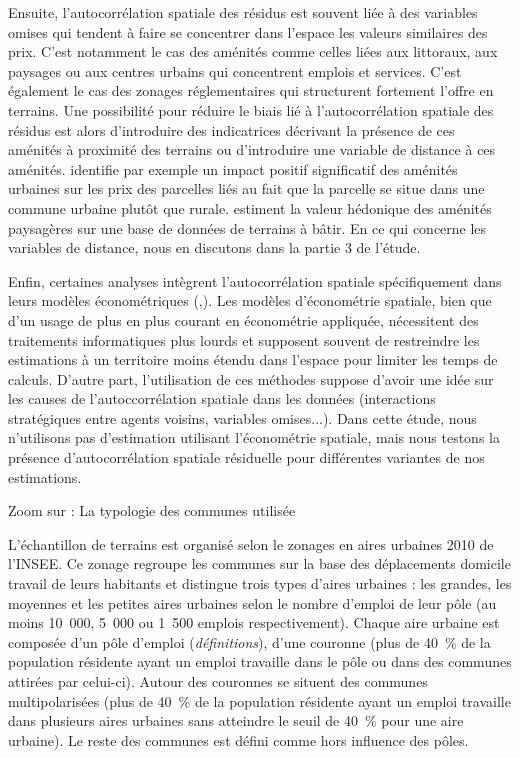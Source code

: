 \documentclass[10.5pt,a4paper]{article}
\newcommand\cadrevert[3]{
\begin{encadre}

\color{vert_n} \fontsize{14}{13}\selectfont Zoom sur : \color{black} \fontsize{14}{13}\selectfont #1
\vspace{4mm}


\color{vert_n} \fontsize{9}{10}\selectfont #2

{\setlength{\parindent}{5mm}%
\color{vert_n} \fontsize{9}{10}\selectfont #3
}
\end{encadre}
}
\begin{document}
{Ensuite, l'autocorrélation spatiale des résidus est souvent liée à des variables omises qui tendent à faire se concentrer dans l'espace les valeurs similaires des prix. C'est notamment le cas des aménités comme celles liées aux littoraux, aux paysages ou aux centres urbains qui concentrent emplois et services. C'est également le cas des zonages réglementaires qui structurent fortement l'offre en terrains. Une possibilité pour réduire le biais lié à l'autocorrélation spatiale des résidus est alors d'introduire des indicatrices décrivant la présence de ces aménités à proximité des terrains ou d'introduire une variable de distance à ces aménités. \cite{Goffette09} identifie par exemple un impact positif significatif des aménités urbaines sur les prix des parcelles liés au fait que la parcelle se situe dans une commune urbaine plutôt que rurale. \cite{Brossard_etal08} estiment la valeur hédonique des aménités paysagères sur une base de données de terrains à bâtir. En ce qui concerne les variables de distance, nous en discutons dans la partie 3 de l'étude. \par   

Enfin, certaines analyses intègrent l'autocorrélation spatiale spécifiquement dans leurs modèles économétriques (\cite{Cava03},\cite{Geniaux_etal15}). Les modèles d'économétrie spatiale, bien que d'un usage de plus en plus courant en économétrie appliquée, nécessitent des traitements informatiques plus lourds et supposent souvent de restreindre les estimations à un territoire moins étendu dans l'espace pour limiter les temps de calculs. D'autre part, l'utilisation de ces méthodes suppose d'avoir une idée sur les causes de l'autoccorrélation spatiale dans les données (interactions stratégiques entre agents voisins, variables omises...). Dans cette étude, nous n'utilisons pas d'estimation utilisant l'économétrie spatiale, mais nous testons la présence d'autocorrélation spatiale résiduelle pour différentes variantes de nos estimations. \par  

\cadrevert{La typologie des communes utilisée}{

L'échantillon de terrains est organisé selon le zonages en aires urbaines 2010 de l'INSEE. Ce zonage regroupe les communes sur la base des déplacements domicile travail de leurs habitants et distingue trois types d'aires urbaines : les grandes, les moyennes et les petites aires urbaines selon le nombre d'emploi de leur pôle (au moins 10~000, 5~000 ou 1~500 emplois respectivement). Chaque aire urbaine est composée d'un pôle d'emploi (\textit{définitions}), d'une couronne (plus de 40~\% de la population résidente ayant un emploi travaille dans le pôle ou dans des communes attirées par celui-ci). Autour des couronnes se situent des communes multipolarisées (plus de 40~\% de la population résidente ayant un emploi travaille dans plusieurs aires urbaines sans atteindre le seuil de 40~\% pour une aire urbaine). Le reste des communes est défini comme hors influence des pôles. \par}{ 

}}
\end{document}
